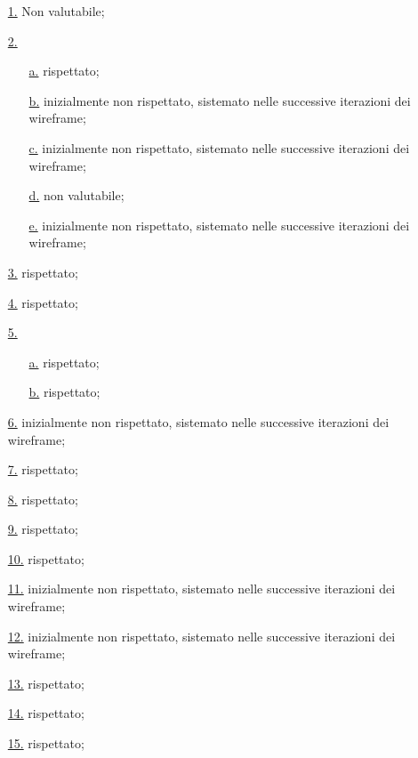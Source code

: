 \begin{itemize}
    \item[{\hyperref[lg:1]{1.}}] Non valutabile;
    \item[{\hyperref[lg:2]{2.}}] \begin{itemize}
        \item[{\hyperref[lg:2.a]{a.}}] rispettato;
        \item[{\hyperref[lg:2.b]{b.}}] inizialmente non rispettato, sistemato nelle successive iterazioni dei wireframe;
        \item[{\hyperref[lg:2.c]{c.}}] inizialmente non rispettato, sistemato nelle successive iterazioni dei wireframe;
        \item[{\hyperref[lg:2.d]{d.}}] non valutabile;
        \item[{\hyperref[lg:2.e]{e.}}] inizialmente non rispettato, sistemato nelle successive iterazioni dei wireframe;
    \end{itemize}
    \item[{\hyperref[lg:3]{3.}}] rispettato;
    \item[{\hyperref[lg:4]{4.}}] rispettato;
    \item[{\hyperref[lg:5]{5.}}] \begin{itemize}
        \item[{\hyperref[lg:5.a]{a.}}] rispettato;
        \item[{\hyperref[lg:5.b]{b.}}] rispettato;
    \end{itemize}
    \item[{\hyperref[lg:6]{6.}}] inizialmente non rispettato, sistemato nelle successive iterazioni dei wireframe;
    \item[{\hyperref[lg:7]{7.}}] rispettato;
    \item[{\hyperref[lg:8]{8.}}] rispettato;
    \item[{\hyperref[lg:9]{9.}}] rispettato;
    \item[{\hyperref[lg:10]{10.}}] rispettato;
    \item[{\hyperref[lg:11]{11.}}] inizialmente non rispettato, sistemato nelle successive iterazioni dei wireframe;
    \item[{\hyperref[lg:12]{12.}}] inizialmente non rispettato, sistemato nelle successive iterazioni dei wireframe;
    \item[{\hyperref[lg:13]{13.}}] rispettato;
    \item[{\hyperref[lg:14]{14.}}] rispettato;
    \item[{\hyperref[lg:15]{15.}}] rispettato;

\end{itemize}
